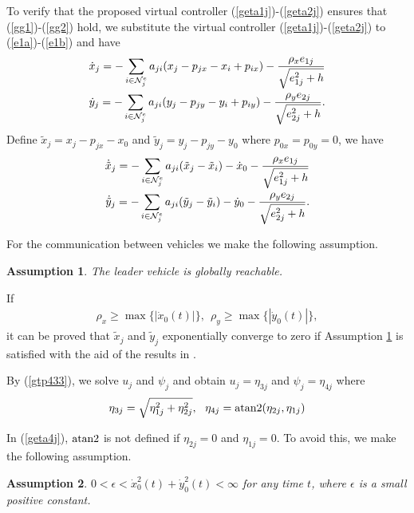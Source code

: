\documentclass[letterpaper, 10 pt, conference]{ieeeconf}  %
\newtheorem{assumption}{Assumption}
\begin{document}
To verify that the proposed virtual controller
(\ref{geta1j})-(\ref{geta2j}) ensures that (\ref{gg1})-(\ref{gg2})
hold, we substitute the virtual controller
(\ref{geta1j})-(\ref{geta2j}) to (\ref{e1a})-(\ref{e1b}) and have
\begin{eqnarray}
\dot{x}_j=-\sum_{i\in{\cal N}^e_j}a_{ji}(x_j-p_{jx}-x_i+p_{ix})-\frac{\rho_xe_{1j}}{\sqrt{e^2_{1j}+h}}\label{gtp1010}\\
\dot{y}_j=-\sum_{i\in{\cal
N}^e_j}a_{ji}(y_j-p_{jy}-y_i+p_{iy})-\frac{\rho_ye_{2j}}{\sqrt{e^2_{2j}+h}}.\label{gtp1013}
\end{eqnarray}
Define $\tilde{x}_j=x_j-p_{jx}-x_0$ and $\tilde{y}_j=y_j-p_{jy}-y_0$
where $p_{0x}=p_{0y}=0$, we have
\begin{eqnarray}
\dot{\tilde{x}}_j=-\sum_{i\in{\cal
N}^e_j}a_{ji}(\tilde{x}_j-\tilde{x}_i)-\dot{x}_0
-\frac{\rho_xe_{1j}}{\sqrt{e^2_{1j}+h}}\label{gtp1010b}\\
\dot{\tilde{y}}_j=-\sum_{i\in{\cal
N}^e_j}a_{ji}(\tilde{y}_j-\tilde{y}_i)-\dot{y}_0-\frac{\rho_ye_{2j}}{\sqrt{e^2_{2j}+h}}.\label{gtp1013b}
\end{eqnarray}

For the communication between vehicles we make the following
assumption.
\begin{assumption}
The leader vehicle is globally reachable. \label{ass_com}
\end{assumption}

If \begin{eqnarray} \rho_x\geq
\max\{|\dot{x}_0(t)|\},~~
\rho_y\geq \max\{|\dot{y}_0(t)|\},\label{grhoy}
\end{eqnarray}
it can be proved that $\tilde{x}_j$ and $\tilde{y}_j$ exponentially
converge to zero if Assumption \ref{ass_com} is satisfied with the aid of the results in
\cite{dongIJC2013}.

By (\ref{gtp433}), we solve $u_j$ and $\psi_j$ and
obtain $u_j=\eta_{3j}$ and $\psi_j=\eta_{4j}$ where
\begin{eqnarray}
\eta_{3j}=\sqrt{\eta_{1j}^2+\eta^2_{2j}},~~
\eta_{4j}={\rm atan2}(\eta_{2j},\eta_{1j})\label{geta4j}
\end{eqnarray}

In (\ref{geta4j}), ${\rm atan2}$ is not defined if $\eta_{2j}=0$ and
$\eta_{1j}=0$. To avoid this, we make the following assumption.

\begin{assumption}
$0<\epsilon<\dot{x}^2_0(t)+\dot{y}^2_0(t)<\infty$ for any time  $t$,
where $\epsilon$ is a small positive constant. \label{ass2}
\end{assumption}
\end{document}
